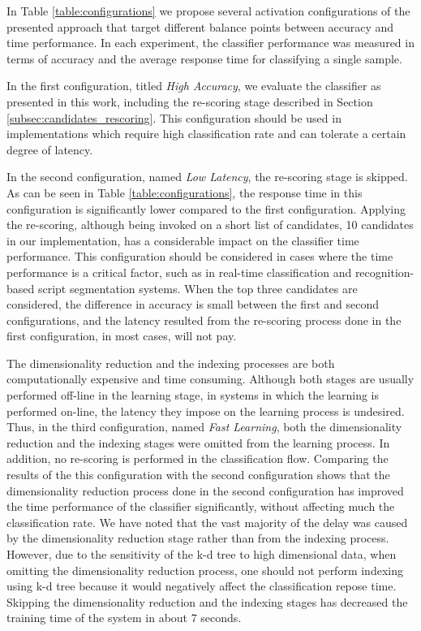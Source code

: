 \documentclass[10pt, conference, compsocconf]{IEEEtran}
\begin{document}
In Table \ref{table:configurations} we propose several activation configurations of the presented approach that target different balance points between accuracy and time performance.
In each experiment, the classifier performance was measured in terms of accuracy and the average response time for classifying a single sample.

In the first configuration, titled \emph{High Accuracy}, we evaluate the classifier as presented in this work, including the re-scoring stage described in Section \ref{subsec:candidates_rescoring}.
This configuration should be used in implementations which require high classification rate and can tolerate a certain degree of latency.

In the second configuration, named \emph{Low Latency}, the re-scoring stage is skipped.
As can be seen in Table \ref{table:configurations}, the response time in this configuration is significantly lower compared to the first configuration.
Applying the re-scoring, although being invoked on a short list of candidates, 10 candidates in our implementation, has a considerable impact on the classifier time performance. 
This configuration should be considered in cases where the time performance is a critical factor, such as in real-time classification and recognition-based script segmentation systems.
When the top three candidates are considered, the difference in accuracy is small between the first and second configurations, and the latency resulted from the re-scoring process done in the first configuration, in most cases, will not pay. 

The dimensionality reduction and the indexing processes are both computationally expensive and time consuming. 
Although both stages are usually performed off-line in the learning stage, in systems in which the learning is performed on-line, the latency they impose on the learning process is undesired.
Thus, in the third configuration, named \emph{Fast Learning}, both the dimensionality reduction and the indexing stages were omitted from the learning process.
In addition, no re-scoring is performed in the classification flow.
Comparing the results of the this configuration with the second configuration shows that the dimensionality reduction process done in the second configuration has improved the time performance of the classifier significantly, without affecting much the classification rate.
We have noted that the vast majority of the delay was caused by the dimensionality reduction stage rather than from the indexing process.
However, due to the sensitivity of the k-d tree to high dimensional data, when omitting the dimensionality reduction process, one should not perform indexing using k-d tree because it would negatively affect the classification repose time.
Skipping the dimensionality reduction and the indexing stages has decreased the training time of the system in about 7 seconds.
\end{document}
